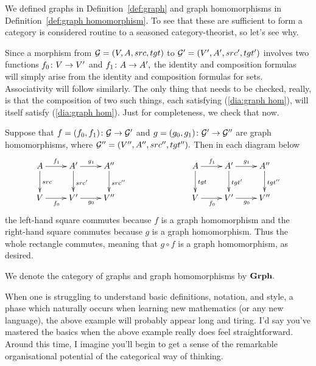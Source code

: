 \documentclass[../main/CT4S-EN-RU]{subfiles}
\begin{document}
\begin{exampleENG}
We defined graphs in Definition~\ref{def:graph} and graph homomorphisms in Definition~\ref{def:graph homomorphism}. To see that these are sufficient to form a category is considered routine to a seasoned category-theorist, so let's see why. 

Since a morphism from $\mathcal{G}=(V,A,src,tgt)$ to $\mathcal{G}'=(V',A',src',tgt')$ involves two functions $f_0\colon V\rightarrow V'$ and $f_1\colon A\rightarrow A',$ the identity and composition formulas will simply arise from the identity and composition formulas for sets. Associativity will follow similarly. The only thing that needs to be checked, really, is that the composition of two such things, each satisfying (\ref{dia:graph hom}), will itself satisfy (\ref{dia:graph hom}). Just for completeness, we check that now.

Suppose that $f=(f_0,f_1)\colon\mathcal{G}\rightarrow\mathcal{G}'$ and $g=(g_0,g_1)\colon\mathcal{G}'\rightarrow\mathcal{G}''$ are graph homomorphisms, where $\mathcal{G}''=(V'',A'',src'',tgt'').$ Then in each diagram below
\begin{align}\label{dia:graph hom comp}
\xymatrix{A\ar[r]^{f_1}\ar[d]^{src}&A'\ar[r]^{g_1}\ar[d]^{src'}&A''\ar[d]^{src''}\\V\ar[r]_{f_0}&V'\ar[r]_{g_0}&V''
}\hspace{1in}
\xymatrix{A\ar[r]^{f_1}\ar[d]^{tgt}&A'\ar[d]^{tgt'}\ar[r]^{g_1}&A''\ar[d]^{tgt''}\\V\ar[r]_{f_0}&V'\ar[r]_{g_0}&V''
}
\end{align}
the left-hand square commutes because $f$ is a graph homomorphism and the right-hand square commutes because $g$ is a graph homomorphism. Thus the whole rectangle commutes, meaning that $g\circ f$ is a graph homomorphism, as desired. 

We denote the category of graphs and graph homomorphisms by ${\mathbf{Grph}}.$
\end{exampleENG}

\begin{exampleRUS}
\end{exampleRUS}

\begin{remarkENG}
When one is struggling to understand basic definitions, notation, and style, a phase which naturally occurs when learning new mathematics (or any new language), the above example will probably appear long and tiring. I'd say you've mastered the basics when the above example really does feel straightforward. Around this time, I imagine you'll begin to get a sense of the remarkable organisational potential of the categorical way of thinking.
\end{remarkENG} 
\end{document}
